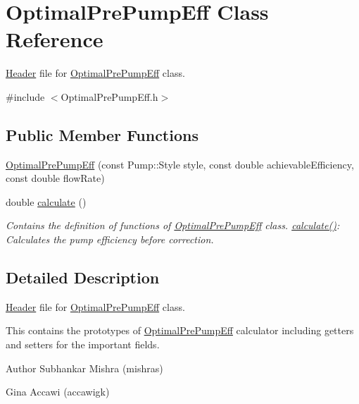 \hypertarget{class_optimal_pre_pump_eff}{}\section{Optimal\+Pre\+Pump\+Eff Class Reference}
\label{class_optimal_pre_pump_eff}


\hyperlink{class_header}{Header} file for \hyperlink{class_optimal_pre_pump_eff}{Optimal\+Pre\+Pump\+Eff} class.  




{\ttfamily \#include $<$Optimal\+Pre\+Pump\+Eff.\+h$>$}

\subsection*{Public Member Functions}
\begin{DoxyCompactItemize}
\item 
\hyperlink{class_optimal_pre_pump_eff_a7a5c64b8e722f4b8e25c709916392e49}{Optimal\+Pre\+Pump\+Eff} (const Pump\+::\+Style style, const double achievable\+Efficiency, const double flow\+Rate)
\item 
double \hyperlink{class_optimal_pre_pump_eff_a7ced63984a89975c4f8f54642701d841}{calculate} ()
\begin{DoxyCompactList}\small\item\em Contains the definition of functions of \hyperlink{class_optimal_pre_pump_eff}{Optimal\+Pre\+Pump\+Eff} class. \hyperlink{class_optimal_pre_pump_eff_a7ced63984a89975c4f8f54642701d841}{calculate()}\+: Calculates the pump efficiency before correction. \end{DoxyCompactList}\end{DoxyCompactItemize}


\subsection{Detailed Description}
\hyperlink{class_header}{Header} file for \hyperlink{class_optimal_pre_pump_eff}{Optimal\+Pre\+Pump\+Eff} class. 

This contains the prototypes of \hyperlink{class_optimal_pre_pump_eff}{Optimal\+Pre\+Pump\+Eff} calculator including getters and setters for the important fields.

\begin{DoxyAuthor}{Author}
Subhankar Mishra (mishras) 

Gina Accawi (accawigk) 
\end{DoxyAuthor}



